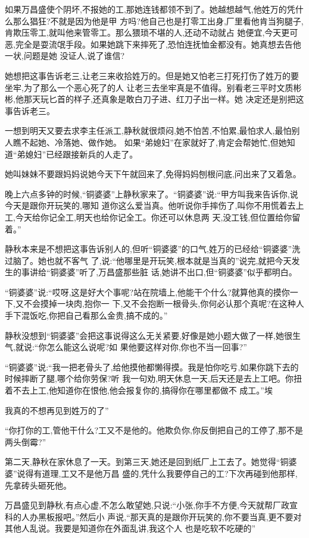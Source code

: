 ﻿\documentclass[12pt]{article}
\begin{document}
如果万昌盛使个阴坏,不报她的工,那她连钱都领不到了。她越想越气,他姓万的凭什么那么猖狂?不就是因为他是甲
方吗?他自己也是打零工出身,厂里看他肯当狗腿子,肯欺压零工,就叫他来管零工。那么猥琐不堪的人,还动不动就占
她便宜,今天更可恶,完全是耍流氓手段。如果她跳下来摔死了,恐怕连抚恤金都没有。她真想去告他一状,问题是她
没证人,说了谁信?

她想把这事告诉老三,让老三来收拾姓万的。但是她又怕老三打死打伤了姓万的要坐牢,为了那么一个恶心死了的人
让老三去坐牢真是不值得。别看老三平时文质彬彬,他那天玩匕首的样子,还真象是敢白刀子进、红刀子出一样。她
决定还是别把这事告诉老三。

一想到明天又要去求李主任派工,静秋就很烦闷,她不怕苦,不怕累,最怕求人,最怕别人瞧不起她、冷落她、做作她。
如果``弟媳妇''在家就好了,肯定会帮她忙,但她知道``弟媳妇''已经跟接新兵的人走了。

她叫妹妹不要跟妈妈说她今天下午就回来了,免得妈妈刨根问底,问出来了又着急。

晚上六点多钟的时候,``铜婆婆''上静秋家来了。``铜婆婆''说:``甲方叫我来告诉你,说今天是跟你开玩笑的,哪知
道你这么爱当真。他听说你手摔伤了,叫你不用慌着去上工,今天给你记全工,明天也给你记全工。你还可以休息两
天,没工钱,但位置给你留着。''

静秋本来是不想把这事告诉别人的,但听``铜婆婆''的口气,姓万的已经给``铜婆婆''洗过脑了。她也就不客气
了,说:``他哪里是开玩笑,根本就是当真的\myrule ''说完,就把今天发生的事讲给``铜婆婆''听了,万昌盛那些脏
话,她讲不出口,但``铜婆婆''似乎都明白。

``铜婆婆''说:``哎呀,这是好大个事呢?站在院墙上,他能干个什么?就算他真的摸你一下,又不会摸掉一块肉,抱你一
下,又不会抱断一根骨头,你何必认那个真呢?在这种人手下混饭吃,你把自己看那么金贵,搞不成的。''

静秋没想到``铜婆婆''会把这事说得这么无关紧要,好像是她小题大做了一样,她很生气,就说:``你怎么能这么说呢?如
果他要这样\myrule 对你,你也不当一回事?''

``铜婆婆''说:``我一把老骨头了,给他摸他都懒得摸。我是怕你吃亏,如果你跳下去的时候摔断了腿,哪个给你劳保?听
我一句劝,明天休息一天,后天还是去上工吧。你扭着不去上工,他知道你在恨他,他会报复你的,搞得你在哪里都做不
成工。''埃

我真的不想再见到姓万的了\myrule ''

``你打你的工,管他干什么?工又不是他的。他欺负你,你反倒把自己的工停了,那不是两头倒霉?''

第二天,静秋在家休息了一天。到第三天,她还是回到纸厂上工去了。她觉得``铜婆婆''说得有道理,工又不是他万昌
盛的,凭什么我要停自己的工?下次再碰到他那样,先拿砖头砸死他。

万昌盛见到静秋,有点心虚,不怎么敢望她,只说:``小张,你手不方便,今天就帮厂政宣科的人办黑板报吧。''然后小
声说,``那天真的是跟你开玩笑的,你不要当真,更不要对其他人乱说。我要是知道你在外面乱讲\myrule ,我这个人
也是吃软不吃硬的\myrule ''
\end{document}
